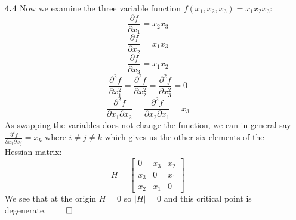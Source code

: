 \documentclass[12pt]{report}
\begin{document}
\begin{enumerate}
\item[\bf 4.4] Now we examine the three variable function $f(x_1,x_2,x_3)=x_1x_2x_3$:
$$\frac{\partial f}{\partial x_1} = x_2x_3$$
$$\frac{\partial f}{\partial x_2} = x_1x_3$$
$$\frac{\partial f}{\partial x_3} = x_1x_2$$
$$\frac{\partial^2 f}{\partial x_1^2} = \frac{\partial^2 f}{\partial x_2^2} = \frac{\partial^2 f}{\partial x_3^2} = 0$$
$$\frac{\partial^2 f}{\partial x_1\partial x_2} = \frac{\partial^2 f}{\partial x_2\partial x_1} = x_3$$
As swapping the variables does not change the function, we can in general say $\frac{\partial^2 f}{\partial x_i\partial x_j} = x_k$ where $i \neq j \neq k$ which gives us the other six elements of the Hessian matrix:
$$H=\begin{bmatrix}
0   & x_3 & x_2 \\
x_3 & 0   & x_1 \\
x_2 & x_1 & 0 
\end{bmatrix}$$
We see that at the origin $H=0$ so $|H|=0$ and this critical point is degenerate. $\qed$



\end{enumerate}
\end{document}
